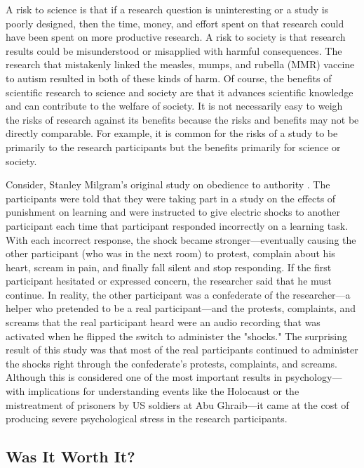 A risk to science is that if a research question is uninteresting or a study is poorly designed, then the time, money, and effort spent on that research could have been spent on more productive research. A risk to society is that research results could be misunderstood or misapplied with harmful consequences. The research that mistakenly linked the measles, mumps, and rubella (MMR) vaccine to autism resulted in both of these kinds of harm. Of course, the benefits of scientific research to science and society are that it advances scientific knowledge and can contribute to the welfare of society. It is not necessarily easy to weigh the risks of research against its benefits because the risks and benefits may not be directly comparable. For example, it is common for the risks of a study to be primarily to the research participants but the benefits primarily for science or society.


Consider, Stanley Milgram's original study on obedience to authority \citep{milgram_behavioral_1963}. The participants were told that they were taking part in a study on the effects of punishment on learning and were instructed to give electric shocks to another participant each time that participant responded incorrectly on a learning task. With each incorrect response, the shock became stronger---eventually causing the other participant (who was in the next room) to protest, complain about his heart, scream in pain, and finally fall silent and stop responding. If the first participant hesitated or expressed concern, the researcher said that he must continue. In reality, the other participant was a confederate of the researcher---a helper who pretended to be a real participant---and the protests, complaints, and screams that the real participant heard were an audio recording that was activated when he flipped the switch to administer the "shocks." The surprising result of this study was that most of the real participants continued to administer the shocks right through the confederate's protests, complaints, and screams. Although this is considered one of the most important results in psychology---with implications for understanding events like the Holocaust or the mistreatment of prisoners by US soldiers at Abu Ghraib---it came at the cost of producing severe psychological stress in the research participants.


\subsection{Was It Worth It?}

